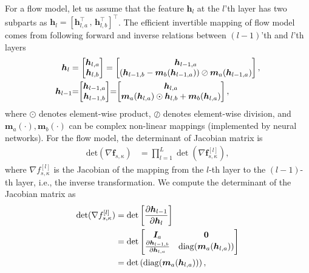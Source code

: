 \documentclass[letterpaper]{article} %
\begin{document}
For a flow model, let us assume that
the feature $\bm{h}_l$ at the $l$'th layer has two subparts as
$\bm{h}_l = [\bm{h}_{l,a}^{\intercal} \, , \, \bm{h}_{l,b}^{\intercal}]^{\intercal}$. The efficient invertible mapping of flow model comes from following forward and inverse relations between $(l-1)$'th and $l$'th layers
\begin{align}\label{eq-gl}
    \bm{h}_{l} &=
    \begin{bmatrix}
      \bm{h}_{l,a}\\
      \bm{h}_{l,b}
    \end{bmatrix}
    =
    \begin{bmatrix}
      \bm{h}_{l-1,a}\\
      \left(  \bm{h}_{l-1,b} - \bm{m}_b(\bm{h}_{l-1,a}) \right)\oslash \bm{m}_a(\bm{h}_{l-1,a}) 
    \end{bmatrix}, \nonumber\\
        \bm{h}_{l-1} \hspace{-0.1cm}&=\hspace{-0.1cm}
    \begin{bmatrix}
      \bm{h}_{l-1,a}\\
      \bm{h}_{l-1,b}
    \end{bmatrix}
    \hspace{-0.1cm}=\hspace{-0.1cm}
    \begin{bmatrix}
      \bm{h}_{l,a}\\
      \bm{m}_a(\bm{h}_{l,a})\odot \bm{h}_{l,b} + \bm{m}_b(\bm{h}_{l,a})
    \end{bmatrix},
\end{align}
where $\odot$ denotes element-wise product, $\oslash$ denotes
element-wise division, and $\bm{m}_a(\cdot), \bm{m}_b(\cdot)$ can be
complex non-linear mappings (implemented by neural networks).
For the flow model, the determinant of Jacobian matrix is
\begin{equation}\label{eq:cat-jacobian}
  \begin{array}{rl}
    \mathrm{det}(\nabla{\bm{f}_{s,\kappa}}) & = \prod_{l=1}^L \det (\nabla{\bm{f}_{s,\kappa}^{[l]}}),
  \end{array}
\end{equation}
where $\nabla{f_{s,\kappa}^{[l]}}$ is the Jacobian of the mapping from the $l$-th layer to the $(l-1)$-th layer, i.e., the inverse transformation. We compute the determinant of the Jacobian matrix as
\begin{align}\label{eq-hl-determinate}
  \det (\nabla{f_{s,\kappa}^{[l]}})& = \det \left[  \frac{ \partial \bm{h}_{l-1}}{\partial \bm{h}_l} \right] \nonumber\\
                                   & = \det
                                     \begin{bmatrix}
                                       \bm{I}_a & \mathbf{0} \nonumber\\
                                       \frac{ \partial \bm{h}_{l-1,b}}{\partial \bm{h}_{l,a}} & \mathrm{diag}(\bm{m}_a(\bm{h}_{l,a}))
                                     \end{bmatrix}\nonumber\\
                                   &= \det \left( \mathrm{diag}(\bm{m}_a(\bm{h}_{l,a})) \right),
\end{align}
\end{document}
